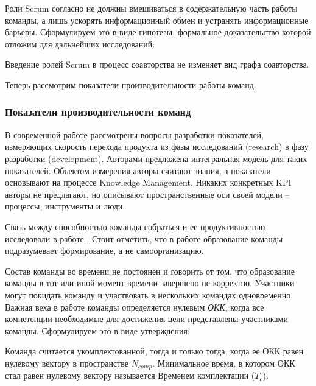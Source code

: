 Роли Scrum согласно \cite{fowler2001agile} не должны вмешиваться в содержательную часть работы команды, а лишь ускорять информационный обмен и устранять информационные барьеры.
Сформулируем это в виде гипотезы, формальное доказательство которой отложим для дальнейших исследований:

\begin{hyp} \label{hyp:ex1}
Введение ролей Scrum в процесс соавторства не изменяет вид графа соавторства.
\end{hyp}

Теперь рассмотрим показатели производительности работы команд.

\subsubsection{Показатели производительности команд}

В современной работе \cite{pereme2016toward} рассмотрены вопросы разработки показателей, измеряющих скорость перехода продукта из фазы исследований (research) в фазу разработки (development). 
Авторами \cite{pereme2016toward} предложена интегральная модель для таких показателей. 
Объектом измерения авторы считают знания, а показатели основывают на процессе Knowledge Management. 
Никаких конкретных KPI авторы не предлагают, но описывают пространственные оси своей модели -- процессы, инструменты и люди.

Связь между способностью команды собраться и ее продуктивностью исследовали в работе \cite{edwards2006relationships}. 
Стоит отметить, что в работе \cite{edwards2006relationships} образование команды подразумевает формирование, а не самоорганизацию.

Состав команды во времени не постоянен и говорить от том, что образование команды в тот или иной момент времени завершено не корректно.
Участники могут покидать команду и участвовать в нескольких командах одновременно. 
Важная веха в работе команды определяется нулевым \emph{ОКК}, когда все компетенции необходимые для достижения цели представлены участниками команды. 
Сформулируем это в виде утверждения:

\begin{defi} \label{defi:ex1}
Команда считается укомплектованной, тогда и только тогда, когда ее ОКК равен нулевому вектору в пространстве $N_{comp}$.
Минимальное время, в котором ОКК стал равен нулевому вектору называется Временем комплектации ($T_c$).
\end{defi}

